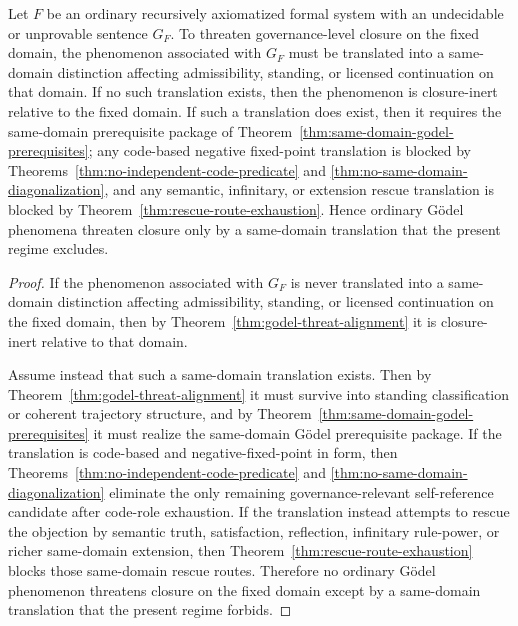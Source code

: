 \begin{theorem}
\label{thm:translation-filter-ordinary-godel}
Let $F$ be an ordinary recursively axiomatized formal system with an undecidable or unprovable sentence $G_F$. To threaten governance-level closure on the fixed domain, the phenomenon associated with $G_F$ must be translated into a same-domain distinction affecting admissibility, standing, or licensed continuation on that domain. If no such translation exists, then the phenomenon is closure-inert relative to the fixed domain. If such a translation does exist, then it requires the same-domain prerequisite package of Theorem~\ref{thm:same-domain-godel-prerequisites}; any code-based negative fixed-point translation is blocked by Theorems~\ref{thm:no-independent-code-predicate} and \ref{thm:no-same-domain-diagonalization}, and any semantic, infinitary, or extension rescue translation is blocked by Theorem~\ref{thm:rescue-route-exhaustion}. Hence ordinary G\"odel phenomena threaten closure only by a same-domain translation that the present regime excludes.
\end{theorem}

\begin{proof}
If the phenomenon associated with $G_F$ is never translated into a same-domain distinction affecting admissibility, standing, or licensed continuation on the fixed domain, then by Theorem~\ref{thm:godel-threat-alignment} it is closure-inert relative to that domain.

Assume instead that such a same-domain translation exists. Then by Theorem~\ref{thm:godel-threat-alignment} it must survive into standing classification or coherent trajectory structure, and by Theorem~\ref{thm:same-domain-godel-prerequisites} it must realize the same-domain G\"odel prerequisite package. If the translation is code-based and negative-fixed-point in form, then Theorems~\ref{thm:no-independent-code-predicate} and \ref{thm:no-same-domain-diagonalization} eliminate the only remaining governance-relevant self-reference candidate after code-role exhaustion. If the translation instead attempts to rescue the objection by semantic truth, satisfaction, reflection, infinitary rule-power, or richer same-domain extension, then Theorem~\ref{thm:rescue-route-exhaustion} blocks those same-domain rescue routes. Therefore no ordinary G\"odel phenomenon threatens closure on the fixed domain except by a same-domain translation that the present regime forbids.
\end{proof}

